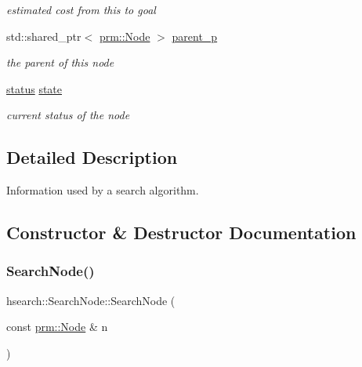 \begin{DoxyCompactItemize}
\begin{DoxyCompactList}\small\item\em estimated cost from this to goal \end{DoxyCompactList}\item 
\mbox{\label{structhsearch_1_1SearchNode_ad651df3e918ceb891c294945e9e41598}} 
std\+::shared\+\_\+ptr$<$ \hyperlink{structprm_1_1Node}{prm\+::\+Node} $>$ \hyperlink{structhsearch_1_1SearchNode_ad651df3e918ceb891c294945e9e41598}{parent\+\_\+p}
\begin{DoxyCompactList}\small\item\em the parent of this node \end{DoxyCompactList}\item 
\mbox{\label{structhsearch_1_1SearchNode_ae137174b53abd37ea386f3e3d9ebf462}} 
\hyperlink{heuristic__search_8hpp_a544e6b02038f7495f0ef622404fdfd79}{status} \hyperlink{structhsearch_1_1SearchNode_ae137174b53abd37ea386f3e3d9ebf462}{state}
\begin{DoxyCompactList}\small\item\em current status of the node \end{DoxyCompactList}\end{DoxyCompactItemize}


\subsection{Detailed Description}
Information used by a search algorithm. 

\subsection{Constructor \& Destructor Documentation}
\mbox{\label{structhsearch_1_1SearchNode_abc34e7eab1d4b3d269f9b360b77936a5}} 
\subsubsection{\texorpdfstring{Search\+Node()}{SearchNode()}}
{\footnotesize\ttfamily hsearch\+::\+Search\+Node\+::\+Search\+Node (\begin{DoxyParamCaption}\item[{const \hyperlink{structprm_1_1Node}{prm\+::\+Node} \&}]{n }\end{DoxyParamCaption})}



